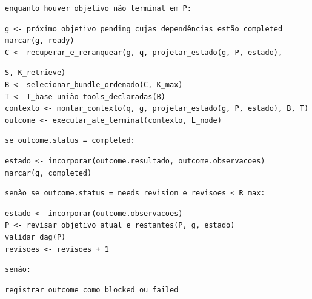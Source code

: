 \documentclass[12pt,a4paper]{article}
\begin{document}

\begin{Verbatim}[breaklines=true,breakanywhere=true,fontsize=\small]
enquanto houver objetivo não terminal em P:
\end{Verbatim}

\begin{Verbatim}[breaklines=true,breakanywhere=true,fontsize=\small]
g <- próximo objetivo pending cujas dependências estão completed
marcar(g, ready)
C <- recuperar_e_reranquear(g, q, projetar_estado(g, P, estado),
\end{Verbatim}

\begin{Verbatim}[breaklines=true,breakanywhere=true,fontsize=\small]
S, K_retrieve)
B <- selecionar_bundle_ordenado(C, K_max)
T <- T_base união tools_declaradas(B)
contexto <- montar_contexto(q, g, projetar_estado(g, P, estado), B, T)
outcome <- executar_ate_terminal(contexto, L_node)
\end{Verbatim}

\begin{Verbatim}[breaklines=true,breakanywhere=true,fontsize=\small]
se outcome.status = completed:
\end{Verbatim}

\begin{Verbatim}[breaklines=true,breakanywhere=true,fontsize=\small]
estado <- incorporar(outcome.resultado, outcome.observacoes)
marcar(g, completed)
\end{Verbatim}

\begin{Verbatim}[breaklines=true,breakanywhere=true,fontsize=\small]
senão se outcome.status = needs_revision e revisoes < R_max:
\end{Verbatim}

\begin{Verbatim}[breaklines=true,breakanywhere=true,fontsize=\small]
estado <- incorporar(outcome.observacoes)
P <- revisar_objetivo_atual_e_restantes(P, g, estado)
validar_dag(P)
revisoes <- revisoes + 1
\end{Verbatim}

\begin{Verbatim}[breaklines=true,breakanywhere=true,fontsize=\small]
senão:
\end{Verbatim}

\begin{Verbatim}[breaklines=true,breakanywhere=true,fontsize=\small]
registrar outcome como blocked ou failed
\end{Verbatim}
\end{document}

